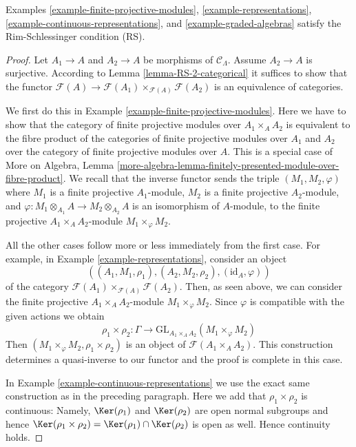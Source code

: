 \begin{lemma}
\label{lemma-examples-have-RS}
Examples \ref{example-finite-projective-modules},
\ref{example-representations},
\ref{example-continuous-representations}, and
\ref{example-graded-algebras}
satisfy the Rim-Schlessinger condition (RS).
\end{lemma}

\begin{proof}
Let $A_1 \to A$ and $A_2 \to A$ be morphisms of $\mathcal{C}_\Lambda$.
Assume $A_2 \to A$ is surjective.
According to Lemma \ref{lemma-RS-2-categorical}
it suffices to show that the functor
$\mathcal{F}(A) \to \mathcal{F}(A_1) \times_{\mathcal{F}(A)} \mathcal{F}(A_2)$
is an equivalence of categories.

\medskip\noindent
We first do this in Example \ref{example-finite-projective-modules}.
Here we have to show that the category of finite projective modules
over $A_1 \times_A A_2$ is equivalent to the fibre product
of the categories of finite projective modules over $A_1$ and $A_2$
over the category of finite projective modules over $A$.
This is a special case of More on Algebra, Lemma
\ref{more-algebra-lemma-finitely-presented-module-over-fibre-product}.
We recall that the inverse functor sends the triple
$(M_1, M_2, \varphi)$ where
$M_1$ is a finite projective $A_1$-module,
$M_2$ is a finite projective $A_2$-module, and
$\varphi : M_1 \otimes_{A_1} A \to M_2 \otimes_{A_2} A$
is an isomorphism of $A$-module, to the finite projective
$A_1 \times_A A_2$-module $M_1 \times_\varphi M_2$.

\medskip\noindent
All the other cases follow more or less immediately from the first case.
For example, in Example \ref{example-representations}, consider an object
$$
((A_1, M_1, \rho_1), (A_2, M_2, \rho_2), (\text{id}_A, \varphi))
$$
of the category $\mathcal{F}(A_1) \times_{\mathcal{F}(A)} \mathcal{F}(A_2)$.
Then, as seen above, we can consider the finite projective
$A_1 \times_A A_2$-module $M_1 \times_\varphi M_2$.
Since $\varphi$ is compatible with the given actions we obtain
$$
\rho_1 \times \rho_2 : \Gamma \longrightarrow
\text{GL}_{A_1 \times_A A_2}(M_1 \times_\varphi M_2)
$$
Then $(M_1 \times_\varphi M_2, \rho_1 \times \rho_2)$
is an object of $\mathcal{F}(A_1 \times_A A_2)$.
This construction determines a quasi-inverse to our functor
and the proof is complete in this case.

\medskip\noindent
In Example \ref{example-continuous-representations}
we use the exact same construction as in the preceding paragraph.
Here we add that $\rho_1 \times \rho_2$ is continuous:
Namely, $\Ker(\rho_1)$ and $\Ker(\rho_2)$ are open normal subgroups
and hence $\Ker(\rho_1 \times \rho_2) = \Ker(\rho_1) \cap \Ker(\rho_2)$
is open as well. Hence continuity holds.


\end{proof}
